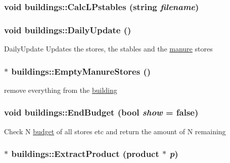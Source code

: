 \label{classbuildings_ae61dd92b601d41c4b3d41dfc3aa28238}
\hypertarget{classbuildings_ad0c0772d201264de61f3d255850fac73}{
\subsubsection[{CalcLPstables}]{\setlength{\rightskip}{0pt plus 5cm}void buildings::CalcLPstables (string {\em filename})}}
\label{classbuildings_ad0c0772d201264de61f3d255850fac73}
\hypertarget{classbuildings_a087a7412a9998a4bf7be6225bc38bb5c}{
\subsubsection[{DailyUpdate}]{\setlength{\rightskip}{0pt plus 5cm}void buildings::DailyUpdate ()}}
\label{classbuildings_a087a7412a9998a4bf7be6225bc38bb5c}
DailyUpdate Updates the stores, the stables and the \hyperlink{classmanure}{manure} stores \hypertarget{classbuildings_a0e445434af31aa7d49db660a67dcfa04}{
\subsubsection[{EmptyManureStores}]{ $\ast$ buildings::EmptyManureStores ()}}
\label{classbuildings_a0e445434af31aa7d49db660a67dcfa04}
remove everything from the \hyperlink{classbuilding}{building} \hypertarget{classbuildings_a91354eb25a6b4b817034883ea0f824c3}{
\subsubsection[{EndBudget}]{\setlength{\rightskip}{0pt plus 5cm}void buildings::EndBudget (bool {\em show} = {\ttfamily false})}}
\label{classbuildings_a91354eb25a6b4b817034883ea0f824c3}
Check N \hyperlink{classbudget}{budget} of all stores etc and return the amount of N remaining \hypertarget{classbuildings_a6a0123f0dd6ed6d314e11e5b8107baf5}{
\subsubsection[{ExtractProduct}]{ $\ast$ buildings::ExtractProduct ({\bf product} $\ast$ {\em p})}}
